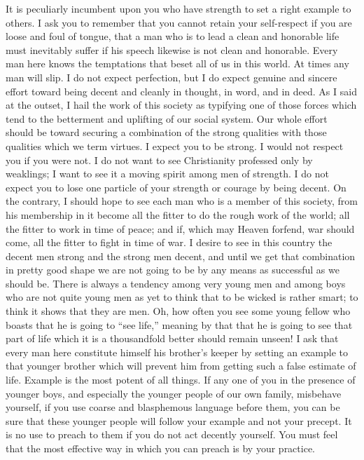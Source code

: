 \documentclass[a4paper]{amsbook}
\begin{document}
It is peculiarly incumbent upon you who have strength to set a right example to others. I ask you to remember that you cannot retain your self-respect if you are loose and foul of tongue, that a man who is to lead a clean and honorable life must inevitably suffer if his speech likewise is not clean and honorable. Every man here knows the temptations that beset all of us in this world. At times any man will slip. I do not expect perfection, but I do expect genuine and sincere effort toward being decent and cleanly in thought, in word, and in deed. As I said at the outset, I hail the work of this society as typifying one of those forces which tend to the betterment and uplifting of our social system. Our whole effort should be toward securing a combination of the strong qualities with those qualities which we term virtues. I expect you to be strong. I would not respect you if you were not. I do not want to see Christianity professed only by weaklings; I want to see it a moving spirit among men of strength. I do not expect you to lose one particle of your strength or courage by being decent. On the contrary, I should hope to see each man who is a member of this society, from his membership in it become all the fitter to do the rough work of the world; all the fitter to work in time of peace; and if, which may Heaven forfend, war should come, all the fitter to fight in time of war. I desire to see in this country the decent men strong and the strong men decent, and until we get that combination in pretty good shape we are not going to be by any means as successful as we should be. There is always a tendency among very young men and among boys who are not quite young men as yet to think that to be wicked is rather smart; to think it shows that they are men. Oh, how often you see some young fellow who boasts that he is going to “see life,” meaning by that that he is going to see that part of life which it is a thousandfold better should remain unseen! I ask that every man here constitute himself his brother's keeper by setting an example to that younger brother which will prevent him from getting such a false estimate of life. Example is the most potent of all things. If any one of you in the presence of younger boys, and especially the younger people of our own family, misbehave yourself, if you use coarse and blasphemous language before them, you can be sure that these younger people will follow your example and not your precept. It is no use to preach to them if you do not act decently yourself. You must feel that the most effective way in which you can preach is by your practice.
\end{document}
